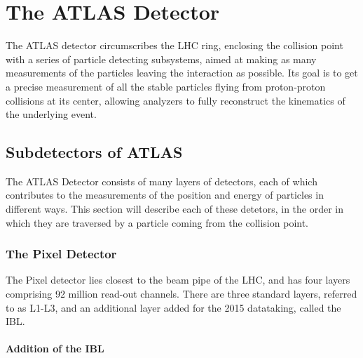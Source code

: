 
\chapter{The ATLAS Detector} %

\label{ch:atlas} %

The ATLAS detector circumscribes the LHC ring, enclosing the collision point with a series of particle detecting subsystems, aimed at making as many measurements of the particles leaving the interaction as possible. Its goal is to get a precise measurement of all the stable particles flying from proton-proton collisions at its center, allowing analyzers to fully reconstruct the kinematics of the underlying event.


\section{Subdetectors of ATLAS}

The ATLAS Detector consists of many layers of detectors, each of which contributes to the measurements of the position and energy of particles in different ways. This section will describe each of these detetors, in the order in which they are traversed by a particle coming from the collision point. 


\subsection{The Pixel Detector}

The Pixel detector lies closest to the beam pipe of the \ac{LHC}, and has four layers comprising 92 million read-out channels. There are three standard layers, referred to as L1-L3, and an additional layer added for the 2015 datataking, called the \ac{IBL}. 

\subsubsection{Addition of the IBL}